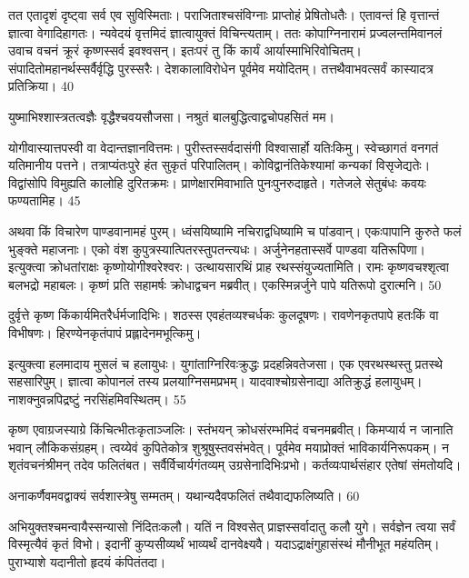   तत एतादृशं दृष्ट्वा सर्व एव सुविस्मिताः।
 पराजिताश्चसंविग्नाः प्राप्तोहं प्रेषितोधतैः।
 एतावन्तं हि वृत्तान्तं ज्ञात्वा वेगादिहागतः।
 न्यवेदयं वृत्तमिदं ज्ञात्वायुक्तं विचिन्त्यताम्।
 ततः कोपाग्निनारामं प्रज्वलन्तमिवानलं उवाच वचनं क्रूरं कृष्णस्सर्व इवश्वसन्।
 इतःपरं तु किं कार्यं आर्यास्माभिरिवोचितम्।
 संपादितोमहानर्थस्सर्वैर्वृद्धि पुरस्सरैः।
 देशकालाविरोधेन पूर्वमेव मयोदितम्।
 तत्तथैवाभवत्सर्वं कास्यादत्र प्रतिक्रिया।
 40

  युष्माभिश्शास्त्रतत्वज्ञैः वृद्धैश्चवयसौजसा।
 नश्रुतं बालबुद्धित्वाद्वचोपहसितं मम।
 
योगीवास्यात्तपस्वी वा वेदान्तज्ञानवित्तमः।
 पुरीस्तस्सर्वदासंगी विश्वासार्हो यतिःकिमु।
 स्वेच्छागतं वनगतं यतिमानीय पत्तने।
 तत्राप्यंतःपुरे हंत सुकृतं परिपालितम्।
 कोविद्वानंतिकेश्यामां कन्यकां विसृजेद्यतेः।
 विद्वांसोपि विमुह्यति कालोहि दुरितक्रमः।
 प्राणेक्षारमिवाभाति पुनःपुनरुदाहृते।
 गतेजले सेतुबंधः कवयः फण्यतामिह।
 45

  अथवा किं विचारेण पाण्डवानामहं पुरम्।
 ध्वंसयिष्यामि नचिराद्वधिष्यामि च पांडवान्।
 एकःपापानि कुरुते फलं भुङ्क्ते महाजनाः।
 एको वंश कुपुत्रस्यात्पितरस्तुपतन्त्यधः।
 अर्जुनेनहतास्सर्वे पाण्डवा यतिरूपिणा।
 इत्युक्त्वा क्रोधतांराक्षः कृष्णोयोगीश्वरेश्वरः।
 उत्थायसारथिं प्राह रथस्संयुज्यतामिति।
 रामः कृष्णवचश्शृत्वा बलभद्रो महाबलः।
 कृष्णं प्रति सहामर्षः क्रोधाद्वचन मब्रवीत्।
 एकस्मिन्नर्जुने पापे यतिरूपो दुरात्मनि।
 50

  दुर्वृत्ते कृष्ण किंकार्यमितरैर्धर्मजादिभिः।
 शठस्स एवहंतव्यश्चर्धकः कुलदूषणः।
 रावणेनकृतपापे हतःकिं वा विभीषणः।
 हिरण्येनकृतंपापं प्रह्लादेनमभूत्किमु।
 
इत्युक्त्वा हलमादाय मुसलं च हलायुधः।
 युगांताग्निरिवःक्रुद्धः प्रदहन्निवतेजसा।
 एक एवरथस्थस्तु प्रतस्थे सहसारिपुम्।
 ज्ञात्वा कोपानलं तस्य प्रलयाग्निसमप्रभम्।
 यादवाश्चोग्रसेनाद्या अतिक्रुद्धं हलायुधम्।
 नाशक्नुवन्नपिद्रष्टुं नरसिंहमिवस्थितम्।
 55

  कृष्ण एवाग्रजस्याग्रे किंचित्भीतःकृताञ्जलिः।
 स्तंभयन् क्रोधसंरम्भमिदं वचनमब्रवीत्।
 किमप्यार्य न जानाति भवान् लौकिकसंग्रहम्।
 त्वय्येवं कुपितेकोत्र शुश्रूषुस्तवसंभवेत्।
 पूर्वमेव मयाप्रोक्तं भाविकार्यनिरूपकम्।
 न शृतंवचनंश्रीमन् तदेव फलितंबत।
 सर्वैर्विचार्यगंतव्यम् उग्रसेनादिभिःप्रभो।
 कर्तव्यःपार्थसंहार एतेषां संमतोयदि।
 
अनाकर्णैवमवद्वाक्यं सर्वशास्त्रेषु सम्मतम्।
 यथान्यदैवफलितं तथैवाद्यफलिष्यति।
 60

  अभियुक्तश्चमन्वायैस्सन्यासो निंदितःकलौ।
 यतिं न विश्वसेत् प्राज्ञस्सर्वादातु कलौ युगे।
 सर्वज्ञेन त्वया सर्वं विस्मृत्यैवं कृतं विभो।
 इदानीं कुप्यसीव्यर्थं भाव्यर्थं दानवेक्ष्यवै।
 यदाऽद्राक्षंगुहासंस्थं मौनीभूत महंयतिम्।
 पुराभ्याशे यदानीतो हृदयं कंपितंतदा।
 
